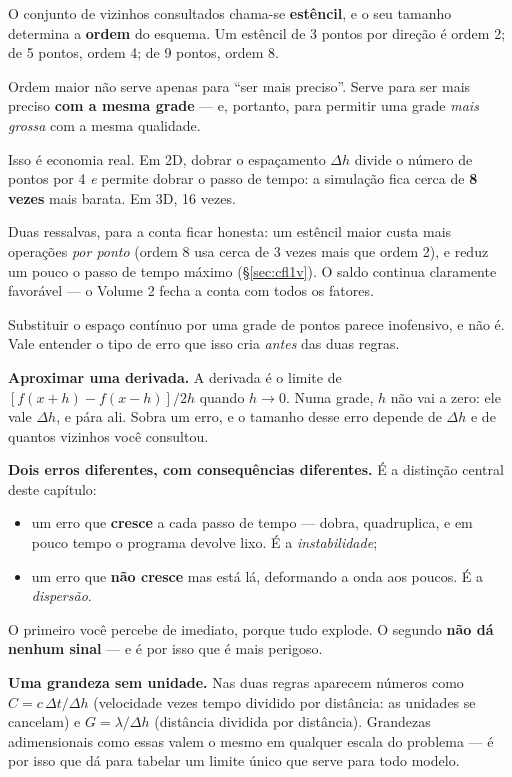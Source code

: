\documentclass[11pt,a4paper,oneside]{report}
\begin{document}
O conjunto de vizinhos consultados chama-se \textbf{est\^encil}, e o seu
tamanho determina a \textbf{ordem} do esquema. Um est\^encil de 3 pontos por
dire\c{c}\~ao \'e ordem 2; de 5 pontos, ordem 4; de 9 pontos, ordem 8.

\begin{teoria}
Ordem maior n\~ao serve apenas para ``ser mais preciso''. Serve para ser mais
preciso \textbf{com a mesma grade} --- e, portanto, para permitir uma grade
\emph{mais grossa} com a mesma qualidade.

Isso \'e economia real. Em 2D, dobrar o espa\c{c}amento $\Delta h$ divide o
n\'umero de pontos por 4 \emph{e} permite dobrar o passo de tempo: a
simula\c{c}\~ao fica cerca de \textbf{8 vezes} mais barata. Em 3D, 16 vezes.

Duas ressalvas, para a conta ficar honesta: um est\^encil maior custa mais
opera\c{c}\~oes \emph{por ponto} (ordem 8 usa cerca de 3 vezes mais que ordem
2), e reduz um pouco o passo de tempo m\'aximo (§\ref{sec:cfl1v}). O saldo
continua claramente favor\'avel --- o Volume 2 fecha a conta com todos os
fatores.
\end{teoria}

\begin{matematica}
Substituir o espa\c{c}o cont\'inuo por uma grade de pontos parece inofensivo,
e n\~ao \'e. Vale entender o tipo de erro que isso cria \emph{antes} das duas
regras.

\textbf{Aproximar uma derivada.} A derivada \'e o limite de
$[f(x+h)-f(x-h)]/2h$ quando $h\to 0$. Numa grade, $h$ n\~ao vai a zero: ele
vale $\Delta h$, e p\'ara ali. Sobra um erro, e o tamanho desse erro depende
de $\Delta h$ e de quantos vizinhos voc\^e consultou.

\textbf{Dois erros diferentes, com consequ\^encias diferentes.} \'E a
distin\c{c}\~ao central deste cap\'itulo:
\begin{itemize}[leftmargin=*, itemsep=1pt]
\item um erro que \textbf{cresce} a cada passo de tempo --- dobra, quadruplica,
e em pouco tempo o programa devolve lixo. \'E a \emph{instabilidade};
\item um erro que \textbf{n\~ao cresce} mas est\'a l\'a, deformando a onda aos
poucos. \'E a \emph{dispers\~ao}.
\end{itemize}
O primeiro voc\^e percebe de imediato, porque tudo explode. O segundo
\textbf{n\~ao d\'a nenhum sinal} --- e \'e por isso que \'e mais perigoso.

\textbf{Uma grandeza sem unidade.} Nas duas regras aparecem n\'umeros como
$C = c\,\Delta t/\Delta h$ (velocidade vezes tempo dividido por dist\^ancia:
as unidades se cancelam) e $G = \lambda/\Delta h$ (dist\^ancia dividida por
dist\^ancia). Grandezas adimensionais como essas valem o mesmo em qualquer
escala do problema --- \'e por isso que d\'a para tabelar um limite \'unico
que serve para todo modelo.
\end{matematica}
\end{document}
